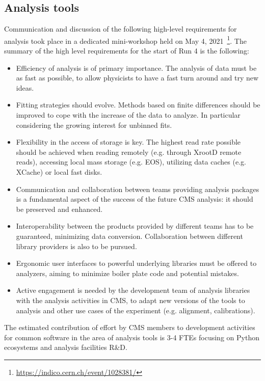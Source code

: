 \subsection{Analysis tools}
Communication and discussion of the following high-level requirements for analysis took place in a dedicated mini-workshop held on May 4, 2021~\footnote{\url{https://indico.cern.ch/event/1028381/}}.
The summary of the high level requirements for the start of Run 4 is the following:
\begin{itemize}
    \item Efficiency of analysis is of primary importance. The analysis of data must be as fast as possible, to allow physicists to have a fast turn around and try new ideas. 
    \item Fitting strategies should evolve. Methods based on finite differences should be improved to cope with the increase of the data to analyze. In particular considering the growing interest for unbinned fits.
    \item Flexibility in the access of storage is key. The highest read rate possible should be achieved when reading remotely (e.g. through XrootD remote reads), accessing local mass storage (e.g. EOS), utilizing data caches (e.g. XCache) or local fast disks.
    \item Communication and collaboration between teams providing analysis packages is a fundamental aspect of the success of the future CMS analysis: it should be preserved and enhanced.
    \item Interoperability between the products provided by different teams has to be guaranteed, minimizing data conversion. Collaboration between different library providers is also to be pursued.
    \item Ergonomic user interfaces to powerful underlying libraries must be offered to analyzers, aiming to minimize boiler plate code and potential mistakes.
    \item Active engagement is needed by the development team of analysis libraries with the analysis activities in CMS, to adapt new versions of the tools to analysis and other use cases of the experiment (e.g. alignment, calibrations).
\end{itemize}

The estimated contribution of effort by CMS members to development activities for common software in the area of analysis tools is 3-4 FTEs focusing on Python ecosystems and analysis facilities R\&D.


